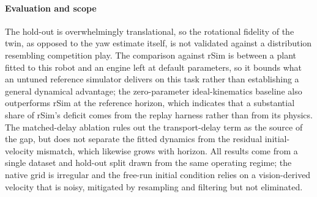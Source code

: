\paragraph{Evaluation and scope}
The hold-out is overwhelmingly translational, so the rotational fidelity of the
twin, as opposed to the yaw estimate itself, is not validated against a
distribution resembling competition play. %
The comparison against rSim is
between a plant fitted to this robot and an engine left at default parameters,
so it bounds what an untuned reference simulator delivers on this task rather
than establishing a general dynamical advantage; the zero-parameter
ideal-kinematics baseline also outperforms rSim at the reference horizon, which
indicates that a substantial share of rSim's deficit comes from the replay
harness rather than from its physics. The matched-delay ablation rules out the
transport-delay term as the source of the gap, but does not separate the fitted
dynamics from the residual initial-velocity mismatch, which likewise grows with
horizon. All results come from a single dataset and hold-out split drawn from
the same operating regime; the native grid is irregular and the free-run initial
condition relies on a vision-derived velocity that is noisy, mitigated by
resampling and filtering but not eliminated.
